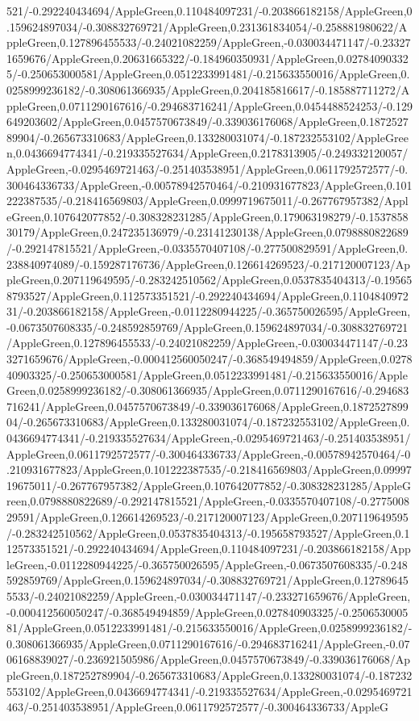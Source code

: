 {\begin{tikzternal}
{521/-0.292240434694/AppleGreen,0.110484097231/-0.203866182158/AppleGreen,0.159624897034/-0.308832769721/AppleGreen,0.231361834054/-0.258881980622/AppleGreen,0.127896455533/-0.24021082259/AppleGreen,-0.030034471147/-0.233271659676/AppleGreen,0.20631665322/-0.184960350931/AppleGreen,0.027840903325/-0.250653000581/AppleGreen,0.0512233991481/-0.215633550016/AppleGreen,0.0258999236182/-0.308061366935/AppleGreen,0.204185816617/-0.185887711272/AppleGreen,0.0711290167616/-0.294683716241/AppleGreen,0.0454488524253/-0.129649203602/AppleGreen,0.0457570673849/-0.339036176068/AppleGreen,0.187252789904/-0.265673310683/AppleGreen,0.133280031074/-0.187232553102/AppleGreen,0.0436694774341/-0.219335527634/AppleGreen,0.2178313905/-0.249332120057/AppleGreen,-0.0295469721463/-0.251403538951/AppleGreen,0.0611792572577/-0.300464336733/AppleGreen,-0.00578942570464/-0.210931677823/AppleGreen,0.101222387535/-0.218416569803/AppleGreen,0.0999719675011/-0.267767957382/AppleGreen,0.107642077852/-0.308328231285/AppleGreen,0.179063198279/-0.153785830179/AppleGreen,0.247235136979/-0.23141230138/AppleGreen,0.0798880822689/-0.292147815521/AppleGreen,-0.0335570407108/-0.277500829591/AppleGreen,0.238840974089/-0.159287176736/AppleGreen,0.126614269523/-0.217120007123/AppleGreen,0.207119649595/-0.283242510562/AppleGreen,0.0537835404313/-0.195658793527/AppleGreen,0.112573351521/-0.292240434694/AppleGreen,0.110484097231/-0.203866182158/AppleGreen,-0.0112280944225/-0.365750026595/AppleGreen,-0.0673507608335/-0.248592859769/AppleGreen,0.159624897034/-0.308832769721/AppleGreen,0.127896455533/-0.24021082259/AppleGreen,-0.030034471147/-0.233271659676/AppleGreen,-0.000412560050247/-0.368549494859/AppleGreen,0.027840903325/-0.250653000581/AppleGreen,0.0512233991481/-0.215633550016/AppleGreen,0.0258999236182/-0.308061366935/AppleGreen,0.0711290167616/-0.294683716241/AppleGreen,0.0457570673849/-0.339036176068/AppleGreen,0.187252789904/-0.265673310683/AppleGreen,0.133280031074/-0.187232553102/AppleGreen,0.0436694774341/-0.219335527634/AppleGreen,-0.0295469721463/-0.251403538951/AppleGreen,0.0611792572577/-0.300464336733/AppleGreen,-0.00578942570464/-0.210931677823/AppleGreen,0.101222387535/-0.218416569803/AppleGreen,0.0999719675011/-0.267767957382/AppleGreen,0.107642077852/-0.308328231285/AppleGreen,0.0798880822689/-0.292147815521/AppleGreen,-0.0335570407108/-0.277500829591/AppleGreen,0.126614269523/-0.217120007123/AppleGreen,0.207119649595/-0.283242510562/AppleGreen,0.0537835404313/-0.195658793527/AppleGreen,0.112573351521/-0.292240434694/AppleGreen,0.110484097231/-0.203866182158/AppleGreen,-0.0112280944225/-0.365750026595/AppleGreen,-0.0673507608335/-0.248592859769/AppleGreen,0.159624897034/-0.308832769721/AppleGreen,0.127896455533/-0.24021082259/AppleGreen,-0.030034471147/-0.233271659676/AppleGreen,-0.000412560050247/-0.368549494859/AppleGreen,0.027840903325/-0.250653000581/AppleGreen,0.0512233991481/-0.215633550016/AppleGreen,0.0258999236182/-0.308061366935/AppleGreen,0.0711290167616/-0.294683716241/AppleGreen,-0.0706168839027/-0.236921505986/AppleGreen,0.0457570673849/-0.339036176068/AppleGreen,0.187252789904/-0.265673310683/AppleGreen,0.133280031074/-0.187232553102/AppleGreen,0.0436694774341/-0.219335527634/AppleGreen,-0.0295469721463/-0.251403538951/AppleGreen,0.0611792572577/-0.300464336733/AppleG}
\end{tikzternal}}

